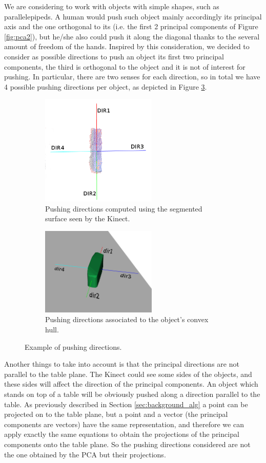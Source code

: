 We are considering to work with objects with simple shapes, such as parallelepipeds. 
A human would push such object mainly accordingly its principal axis and the one orthogonal to its (i.e. the first 2 principal components of Figure \ref{fig:pca2}), but he/she also could push it along the diagonal thanks to the several amount of freedom of the hands. 
Inspired by this consideration, we decided to consider as possible directions to push an object  its first two principal components, the third is orthogonal to the object and it is not of interest for pushing. In particular, there are two senses for each direction, so in total we have 4 possible pushing directions per object, as depicted in Figure \ref{fig:directions}.

\begin{figure}
\centering
\begin{subfigure}[t]{6cm}
\includegraphics[width=5.5cm]{Img/pushing/directions.png}
\caption{Pushing directions computed using the segmented surface seen by the Kinect.}\label{fig:directions1}
\end{subfigure}
\begin{subfigure}[t]{6cm}
\includegraphics[width=5.5cm]{Img/pushing/directions2.png}
\caption{Pushing directions associated to the object's convex hull.}
\label{fig:directions2}
\end{subfigure}
\caption{Example of pushing directions.}\label{fig:directions}
\end{figure}

Another things to take into account is that the principal directions are not parallel to the table plane. The Kinect could see some sides of the objects, and these sides will affect the direction of the principal components. An object which stands on top of a table will be obviously pushed along a direction parallel to the table. As previously described in Section \ref{sec:background_alg} a point can be projected on to the table plane, but a point and a vector (the principal components are vectors) have the same representation, and therefore we can apply exactly the same equations to obtain the projections of the principal components onto the table plane. So the pushing directions considered are not the one obtained by the PCA but their projections. 


